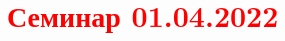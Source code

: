 \documentclass[main.tex]{subfiles}
\begin{document}
\section{\textcolor{red}{Семинар 01.04.2022}}
\end{document}
